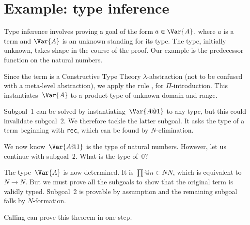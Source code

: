 \section{Example: type inference}
Type inference involves proving a goal of the form $a\in\Var{A}$, where $a$
is a term and $\Var{A}$ is an unknown standing for its type.  The type,
initially
unknown, takes shape in the course of the proof.  Our example is the
predecessor function on the natural numbers.
Since the term is a Constructive Type Theory $\lambda$-abstraction (not to
be confused with a meta-level abstraction), we apply the rule
, for $\Pi$-introduction.  This instantiates~$\Var{A}$ to a
product type of unknown domain and range.
Subgoal~1 can be solved by instantiating~$\Var{A@1}$ to any type, but this
could invalidate subgoal~2.  We therefore tackle the latter subgoal.  It
asks the type of a term beginning with {\tt rec}, which can be found by
$N$-elimination.
We now know~$\Var{A@1}$ is the type of natural numbers.  However, let us
continue with subgoal~2.  What is the type of~0?
The type~$\Var{A}$ is now determined.  It is $\prod@{n\in N}N$, which is
equivalent to $N\to N$.  But we must prove all the subgoals to show that
the original term is validly typed.  Subgoal~2 is provable by assumption
and the remaining subgoal falls by $N$-formation.
Calling  can prove this theorem in one step.


